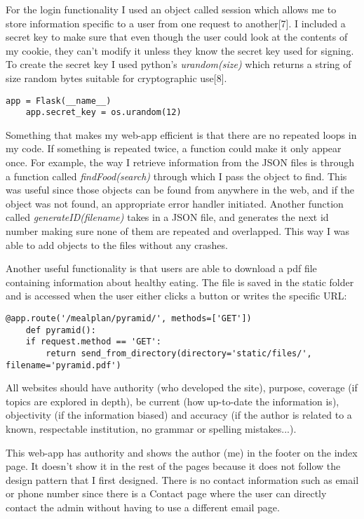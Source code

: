\documentclass[10pt, a4paper]{article}
\begin{document}
    For the login functionality I used an object called session which allows me to store information specific to a user from one request to another[7]. I included a secret key to make sure that even though the user could look at the contents of my cookie, they can't modify it unless they know the secret key used for signing. To create the secret key I used python's \textit{urandom(size)} which returns a string of size random bytes suitable for cryptographic use[8].

    \begin{lstlisting}[caption = How secret key is created]
    app = Flask(__name__)
    app.secret_key = os.urandom(12)
    \end{lstlisting}

    Something that makes my web-app efficient is that there are no repeated loops in my code. If something is repeated twice, a function could make it only appear once. For example, the way I retrieve information from the JSON files is through a function called \textit{findFood(search)} through which I pass the object to find. This was useful since those objects can be found from anywhere in the web, and if the object was not found, an appropriate error handler initiated. Another function called \textit{generateID(filename)} takes in a JSON file, and generates the next id number making sure none of them are repeated and overlapped. This way I was able to add objects to the files without any crashes.

    Another useful functionality is that users are able to download a pdf file containing information about healthy eating. The file is saved in the static folder and is accessed when the user either clicks a button or writes the specific URL:

    \begin{lstlisting}[caption = Downloading files]
    @app.route('/mealplan/pyramid/', methods=['GET'])
    def pyramid():
    if request.method == 'GET':
        return send_from_directory(directory='static/files/', filename='pyramid.pdf')
    \end{lstlisting}

    All websites should have authority (who developed the site), purpose, coverage (if topics are explored in depth), be current (how up-to-date the information is), objectivity (if the information biased) and accuracy (if the author is related to a known, respectable institution, no grammar or spelling mistakes...).

    This web-app has authority and shows the author (me) in the footer on the index page. It doesn't show it in the rest of the pages because it does not follow the design pattern that I first designed. There is no contact information such as email or phone number since there is a Contact page where the user can directly contact the admin without having to use a different email page.
\end{document}
